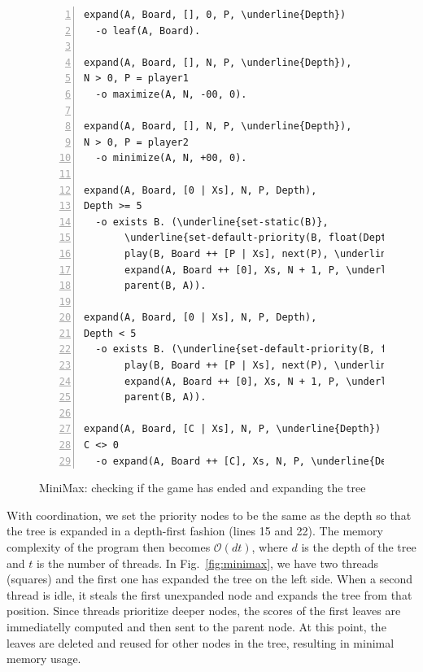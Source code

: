 \begin{figure}[h!]
\scriptsize\begin{Verbatim}[numbers=left,commandchars=\\\{\}]
expand(A, Board, [], 0, P, \underline{Depth})
  -o leaf(A, Board).

expand(A, Board, [], N, P, \underline{Depth}),
N > 0, P = player1
  -o maximize(A, N, -00, 0).

expand(A, Board, [], N, P, \underline{Depth}),
N > 0, P = player2
  -o minimize(A, N, +00, 0).

expand(A, Board, [0 | Xs], N, P, Depth),
Depth >= 5
  -o exists B. (\underline{set-static(B)},
       \underline{set-default-priority(B, float(Depth + 1))},
       play(B, Board ++ [P | Xs], next(P), \underline{Depth + 1}),
       expand(A, Board ++ [0], Xs, N + 1, P, \underline{Depth}),
       parent(B, A)).

expand(A, Board, [0 | Xs], N, P, Depth),
Depth < 5
  -o exists B. (\underline{set-default-priority(B, float(Depth + 1))},
       play(B, Board ++ [P | Xs], next(P), \underline{Depth + 1}),
       expand(A, Board ++ [0], Xs, N + 1, P, \underline{Depth}),
       parent(B, A)).

expand(A, Board, [C | Xs], N, P, \underline{Depth})
C <> 0
  -o expand(A, Board ++ [C], Xs, N, P, \underline{Depth}).
\end{Verbatim}
\caption{MiniMax: checking if the game has ended and expanding the tree}
\label{minimax:check-end}
\end{figure}
\normalsize

With coordination, we set the priority nodes to be the same as the
depth so that the tree is expanded in a depth-first fashion (lines 15 and 22).
The memory complexity of the program then becomes $\mathcal{O}(d t)$, where $d$
is the depth of the tree and $t$ is the number of threads. In
Fig.~\ref{fig:minimax}, we have two threads (squares) and the first one has
expanded the tree on the left side. When a second thread is idle, it steals the
first unexpanded node and expands the tree from that position. Since threads
prioritize deeper nodes, the scores of the first leaves are immediatelly
computed and then sent to the parent node. At this point, the leaves are deleted
and reused for other nodes in the tree, resulting in minimal memory usage.

